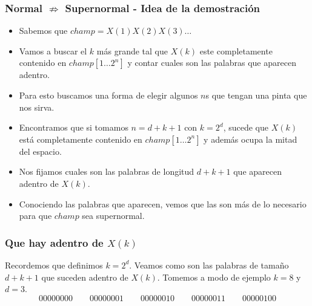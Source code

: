 \documentclass[10pt,mathserif]{beamer}%
\begin{document}
\begin{frame}
  \frametitle{Normal $\nRightarrow$ Supernormal - Idea de la demostración}
  \begin{itemize}
    \item Sabemos que $champ = X(1)X(2)X(3)\dots$
    \pause 
    \item Vamos a buscar el $k$ más grande tal que $X(k)$ este completamente contenido en $champ[1\dots 2^n]$ y contar cuales son las palabras que aparecen adentro.
    \pause 
    \item Para esto buscamos una forma de elegir algunos $n$s que tengan una pinta que nos sirva.
    \pause
    \item Encontramos que si tomamos $n = d + k + 1$ con $k = 2^d$, sucede que $X(k)$ está completamente contenido en $champ[1\dots 2^n]$ y además ocupa la mitad del espacio.
    \pause 
    \item Nos fijamos cuales son las palabras de longitud $d + k + 1$ que aparecen adentro de $X(k)$.
    \pause
    \item Conociendo las palabras que aparecen, vemos que las son más de lo necesario para que $champ$ sea supernormal.
  \end{itemize}
\end{frame}

\begin{frame}
  \frametitle{Que hay adentro de $X(k)$}
  Recordemos que definimos $k = 2^d$.
  Veamos como son las palabras de tamaño $d + k + 1$ que suceden adentro de $X(k)$. Tomemos a modo de ejemplo $k = 8$ y $d = 3$.
  \pause
  $$00000000 \qquad 00000001 \qquad 00000010 \qquad 00000011 \qquad 00000100$$
  \par
\end{frame} 
\end{document}
